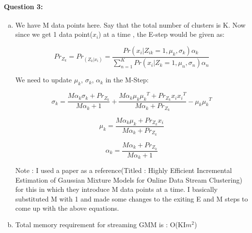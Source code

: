 \documentclass[letterpaper,11pt]{article}
\begin{document}
\paragraph{Question 3:} 
\begin{enumerate}[(a)]
\item
We have M data points here.
Say that the total number of clusters is K.
Now since we get 1 data point($x_i$) at a time , the E-step would be given as:

\[
	Pr_{Z_{k}} = Pr_{(Z_{k}|x_i)} = \frac{Pr(x_i|Z_{ik} = 1,{\mu}_k,{\sigma}_k) {\alpha}_k}{\sum_{n=1}^{K}Pr(x_i|Z_{k} = 1,{\mu}_n,{\sigma}_n) {\alpha}_n}
\]

We need to update ${\mu}_k$, ${\sigma}_k$, ${\alpha}_k$ in the M-Step:

\[
	{\sigma}_k = \frac{{M{{\alpha}_k}{\sigma}_k + Pr_{Z_{k}}}}{M{{\alpha}_k} + 1} + \frac{M{{\alpha}_k}{\mu_k}{\mu_k}^T + Pr_{Z_k}{x_i}{x_i}^T}{M{{\alpha}_k} + Pr_{Z_k}} -{\mu_k}{\mu_k}^T
\]

\[
	{\mu}_k = \frac{M{{\alpha}_k}{\mu}_k + Pr_{Z_{k}}{x_i}}{M{{\alpha}_k} + Pr_{Z_{k}}}
\]

\[
	{\alpha}_k = \frac{M{{\alpha}_k} + Pr_{Z_{k}}}{M{{\alpha}_k} + 1} \tag{Since We have only 1 data point coming int}
\]

Note : I used a paper as a reference(Titled : Highly Efficient Incremental Estimation of Gaussian Mixture
Models for Online Data Stream Clustering) for this in which they introduce M data points at a time. I basically substituted M with 1 and made some changes to the exiting E and M steps to come up with the above equations.

\item
Total memory requirement for streaming GMM is : O(KI$m^2$) 
	
\end{enumerate}
\end{document}
